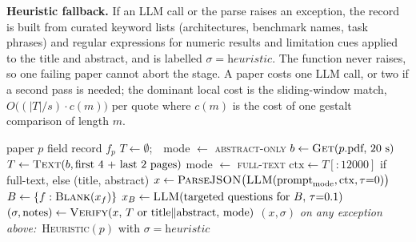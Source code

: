 \documentclass[conference]{IEEEtran}
\begin{document}
\textbf{Heuristic fallback.} If an LLM call or the parse raises an exception, the record is built from curated keyword lists (architectures, benchmark names, task phrases) and regular expressions for numeric results and limitation cues applied to the title and abstract, and is labelled $\sigma=\textit{heuristic}$. The function never raises, so one failing paper cannot abort the stage. A paper costs one LLM call, or two if a second pass is needed; the dominant local cost is the sliding-window match, $O\!\big((|T|/s)\cdot c(m)\big)$ per quote where $c(m)$ is the cost of one gestalt comparison of length $m$.

\begin{algorithm}[!t]
\caption{Grounded extraction for one paper}
\label{alg:extract}
\small
\begin{algorithmic}[1]
\Require paper $p$
\Ensure field record $f_p$
\State $T\gets\emptyset$;\ \ mode $\gets$ \textsc{abstract-only}
  \State $b\gets\textsc{Get}(p.\text{pdf},\,20\text{ s})$
    \State $T\gets\textsc{Text}(b,\text{first 4 + last 2 pages})$
     mode $\gets$ \textsc{full-text} \EndIf
  \EndIf
\EndIf
\State $\mathrm{ctx}\gets T[{:}12000]$ if full-text, else (title, abstract)
\State $x\gets\textsc{ParseJSON}\big(\textsc{LLM}(\text{prompt}_{\text{mode}},\mathrm{ctx},\tau{=}0)\big)$
\State $B\gets\{f:\textsc{Blank}(x_f)\}$
  \State $x_B\gets\textsc{LLM}(\text{targeted questions for }B,\,\tau{=}0.1)$
\EndIf
\State $(\sigma,\text{notes})\gets\textsc{Verify}(x,\,T\text{ or title}\Vert\text{abstract},\,\text{mode})$
\State \Return $(x,\sigma)$
\Statex \textit{on any exception above:}\ \Return \textsc{Heuristic}$(p)$ with $\sigma=\textit{heuristic}$
\end{algorithmic}
\end{algorithm}
\end{document}
